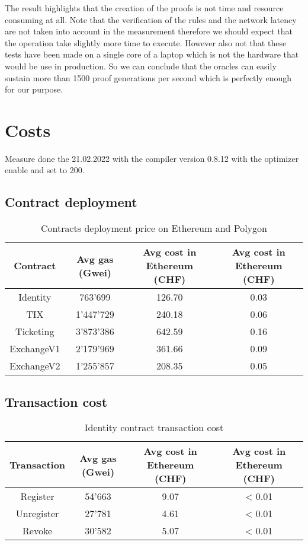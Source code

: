 \documentclass[a4paper,11pt,oneside]{report}
\begin{document}
The result highlights that the creation of the proofs is not time and resource consuming at all. Note that the verification of the rules and the network latency are not taken into account in the measurement therefore we should expect that the operation take slightly more time to execute. However also not that these tests have been made on a single core of a laptop which is not the hardware that would be use in production. So we can conclude that the oracles can easily sustain more than 1500 proof generations per second which is perfectly enough for our purpose.

\section{Costs}
Measure done the 21.02.2022 with the compiler version 0.8.12 with the optimizer enable and set to 200.

\subsection{Contract deployment}
\begin{table}[h!]
\begin{center}
\begin{NiceTabular}{ |c||c|c|c| }
 \hline
 Contract & Avg gas (Gwei) & Avg cost in Ethereum (CHF) & Avg cost in Ethereum (CHF) \\
 \hline \hline
 Identity & 763'699 & 126.70 & 0.03 \\
 TIX & 1'447'729 & 240.18 & 0.06 \\
 Ticketing & 3'873'386 & 642.59 & 0.16 \\
 ExchangeV1 & 2'179'969 & 361.66 & 0.09 \\
 ExchangeV2 & 1'255'857 & 208.35 & 0.05 \\
 \hline
\end{NiceTabular}
\caption{Contracts deployment price on Ethereum and Polygon}
\label{table:contracts_deployment_price}
\end{center}
\end{table}

\subsection{Transaction cost}
\begin{table}[h!]
\begin{center}
\begin{NiceTabular}{ |c||c|c|c| }
 \hline
 Transaction & Avg gas (Gwei) & Avg cost in Ethereum (CHF) & Avg cost in Ethereum (CHF) \\
 \hline \hline
 Register & 54'663 & 9.07 & < 0.01 \\
 Unregister & 27'781 & 4.61 & < 0.01 \\
 Revoke & 30'582 & 5.07 & < 0.01 \\
 \hline
\end{NiceTabular}
\caption{Identity contract transaction cost}
\label{table:identity_contract_transaction_cost}
\end{center}
\end{table}
\end{document}
